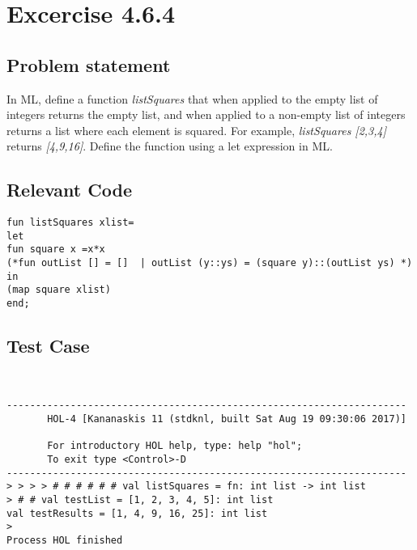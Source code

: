\documentclass{report}
\begin{document}
\chapter{Excercise 4.6.4}
\label{cha:4.6.4}

\section{Problem statement}
\label{problem-statement-4-6-4}
In ML, define a function \emph{listSquares} that when applied to the empty list of integers returns the empty list, and when applied to a non-empty list of integers returns a list where each element is squared. For example, \emph{listSquares [2,3,4]} returns \emph{[4,9,16]}. Define the function using a let expression in ML.

\section{Relevant Code}
\label{rel-code-4-6-4}
\begin{lstlisting}[frame=TB]
fun listSquares xlist=
let
fun square x =x*x
(*fun outList [] = []  | outList (y::ys) = (square y)::(outList ys) *)
in
(map square xlist)
end;
\end{lstlisting}

\section{Test Case}
\label{test-results-4-6-4}

\begin{session}
  \begin{scriptsize}
\begin{verbatim}


---------------------------------------------------------------------
       HOL-4 [Kananaskis 11 (stdknl, built Sat Aug 19 09:30:06 2017)]

       For introductory HOL help, type: help "hol";
       To exit type <Control>-D
---------------------------------------------------------------------
> > > > # # # # # # val listSquares = fn: int list -> int list
> # # val testList = [1, 2, 3, 4, 5]: int list
val testResults = [1, 4, 9, 16, 25]: int list
> 
Process HOL finished

\end{verbatim}
  \end{scriptsize}
\end{session}
\end{document}
